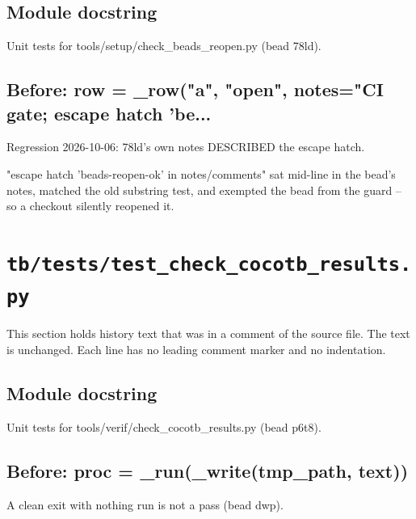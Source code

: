 \begin{record}

\subsection*{Module docstring}

\begin{textblock}
Unit tests for tools/setup/check_beads_reopen.py (bead 78ld).
\end{textblock}

\subsection*{Before: row = \_row("a", "open", notes="CI gate; escape hatch 'be...}

\begin{textblock}
Regression 2026-10-06: 78ld's own notes DESCRIBED the escape hatch.

"escape hatch 'beads-reopen-ok' in notes/comments" sat mid-line in the
bead's notes, matched the old substring test, and exempted the bead from
the guard -- so a checkout silently reopened it.
\end{textblock}

\end{record}

\section{\texttt{tb/tests/test\_check\_cocotb\_results.py}}\label{cr:suite:test-check-cocotb-results}

This section holds history text that was in a comment of the source file. The text is unchanged. Each line has no leading comment marker and no indentation.

\begin{record}

\subsection*{Module docstring}

\begin{textblock}
Unit tests for tools/verif/check_cocotb_results.py (bead p6t8).
\end{textblock}

\subsection*{Before: proc = \_run(\_write(tmp\_path, text))}

\begin{textblock}
A clean exit with nothing run is not a pass (bead dwp).
\end{textblock}

\end{record}


